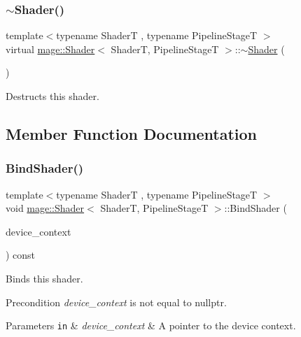 \subsubsection{\texorpdfstring{$\sim$\+Shader()}{~Shader()}}
{\footnotesize\ttfamily template$<$typename ShaderT , typename Pipeline\+StageT $>$ \\
virtual \hyperlink{classmage_1_1_shader}{mage\+::\+Shader}$<$ ShaderT, Pipeline\+StageT $>$\+::$\sim$\hyperlink{classmage_1_1_shader}{Shader} (\begin{DoxyParamCaption}{ }\end{DoxyParamCaption})\hspace{0.3cm}{\ttfamily [virtual]}}

Destructs this shader. 

\subsection{Member Function Documentation}
\hypertarget{classmage_1_1_shader_ae21e9f9a4e97d8d73f3988815c1cb205}{}\label{classmage_1_1_shader_ae21e9f9a4e97d8d73f3988815c1cb205} 
\subsubsection{\texorpdfstring{Bind\+Shader()}{BindShader()}}
{\footnotesize\ttfamily template$<$typename ShaderT , typename Pipeline\+StageT $>$ \\
void \hyperlink{classmage_1_1_shader}{mage\+::\+Shader}$<$ ShaderT, Pipeline\+StageT $>$\+::Bind\+Shader (\begin{DoxyParamCaption}\item[{I\+D3\+D11\+Device\+Context4 $\ast$}]{device\+\_\+context }\end{DoxyParamCaption}) const\hspace{0.3cm}{\ttfamily [noexcept]}}

Binds this shader.

\begin{DoxyPrecond}{Precondition}
{\itshape device\+\_\+context} is not equal to {\ttfamily nullptr}. 
\end{DoxyPrecond}

\begin{DoxyParams}[1]{Parameters}
\mbox{\tt in}  & {\em device\+\_\+context} & A pointer to the device context. \\
\hline
\end{DoxyParams}
\hypertarget{classmage_1_1_shader_abcb23e3972015f2cc9127e1e4cd4569b}{}\label{classmage_1_1_shader_abcb23e3972015f2cc9127e1e4cd4569b} 
